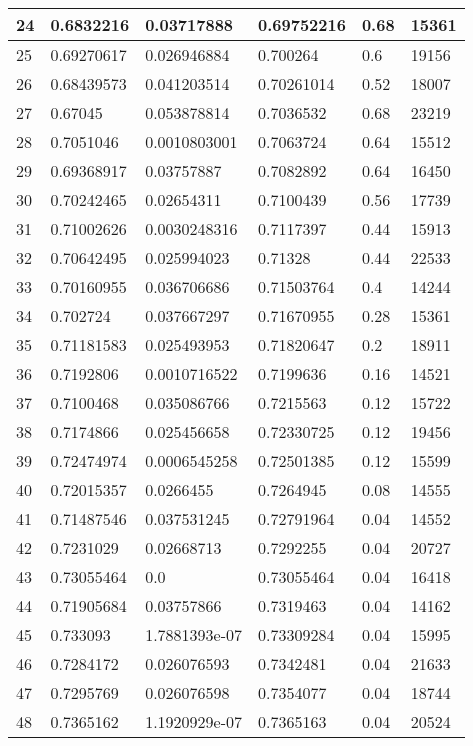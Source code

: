 \begin{longtable}{|l|l|l|l|l|l|}
24 & 0.6832216 & 0.03717888 & 0.69752216 & 0.68 & 15361 \\ \hline 
25 & 0.69270617 & 0.026946884 & 0.700264 & 0.6 & 19156 \\ \hline 
26 & 0.68439573 & 0.041203514 & 0.70261014 & 0.52 & 18007 \\ \hline 
27 & 0.67045 & 0.053878814 & 0.7036532 & 0.68 & 23219 \\ \hline 
28 & 0.7051046 & 0.0010803001 & 0.7063724 & 0.64 & 15512 \\ \hline 
29 & 0.69368917 & 0.03757887 & 0.7082892 & 0.64 & 16450 \\ \hline 
30 & 0.70242465 & 0.02654311 & 0.7100439 & 0.56 & 17739 \\ \hline 
31 & 0.71002626 & 0.0030248316 & 0.7117397 & 0.44 & 15913 \\ \hline 
32 & 0.70642495 & 0.025994023 & 0.71328 & 0.44 & 22533 \\ \hline 
33 & 0.70160955 & 0.036706686 & 0.71503764 & 0.4 & 14244 \\ \hline 
34 & 0.702724 & 0.037667297 & 0.71670955 & 0.28 & 15361 \\ \hline 
35 & 0.71181583 & 0.025493953 & 0.71820647 & 0.2 & 18911 \\ \hline 
36 & 0.7192806 & 0.0010716522 & 0.7199636 & 0.16 & 14521 \\ \hline 
37 & 0.7100468 & 0.035086766 & 0.7215563 & 0.12 & 15722 \\ \hline 
38 & 0.7174866 & 0.025456658 & 0.72330725 & 0.12 & 19456 \\ \hline 
39 & 0.72474974 & 0.0006545258 & 0.72501385 & 0.12 & 15599 \\ \hline 
40 & 0.72015357 & 0.0266455 & 0.7264945 & 0.08 & 14555 \\ \hline 
41 & 0.71487546 & 0.037531245 & 0.72791964 & 0.04 & 14552 \\ \hline 
42 & 0.7231029 & 0.02668713 & 0.7292255 & 0.04 & 20727 \\ \hline 
43 & 0.73055464 & 0.0 & 0.73055464 & 0.04 & 16418 \\ \hline 
44 & 0.71905684 & 0.03757866 & 0.7319463 & 0.04 & 14162 \\ \hline 
45 & 0.733093 & 1.7881393e-07 & 0.73309284 & 0.04 & 15995 \\ \hline 
46 & 0.7284172 & 0.026076593 & 0.7342481 & 0.04 & 21633 \\ \hline 
47 & 0.7295769 & 0.026076598 & 0.7354077 & 0.04 & 18744 \\ \hline 
48 & 0.7365162 & 1.1920929e-07 & 0.7365163 & 0.04 & 20524 \\ \hline 

\end{longtable}
